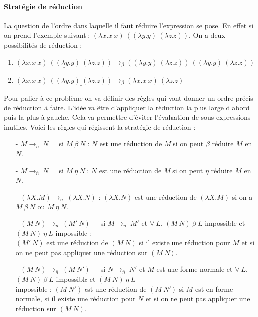 \documentclass[10pt,a4paper]{report}
\begin{document}
	
	\paragraph{Stratégie de réduction} 
	La question de l'ordre dans laquelle il faut réduire l'expression se pose. En effet si on prend l'exemple suivant : $(\lambda x.x~x)~((\lambda y.y)~(\lambda z.z))$. On a deux possibilités de réduction :
	\begin{enumerate}
		\item $\underline{(\lambda x.x~x)~((\lambda y.y)~(\lambda z.z))} \rightarrow_{\beta} ((\lambda y.y)~(\lambda z.z))~((\lambda y.y)~(\lambda z.z))$ 
		\item $(\lambda x.x~x)~\underline{((\lambda y.y)~(\lambda z.z))} \rightarrow_{\beta} (\lambda x.x~x)~(\lambda z.z)$ 
	\end{enumerate} 
	\bigbreak
	
	
	Pour palier à ce problème on va définir des règles qui vont donner un ordre précis de réduction à faire. L'idée va être d'appliquer la réduction la plus large d'abord puis la plus à gauche. Cela va permettre d'éviter l'évaluation de sous-expressions inutiles. Voici les règles qui régissent la stratégie de réduction :
	\begin{itemize}
		\item[-] $M \longrightarrow_{\bar{n}}~N$~~~si $M~\beta~N$ : $N$ est une réduction de $M$ si on peut $\beta$ réduire $M$ en $N$.
		\smallbreak
		\item[-] $M \longrightarrow_{\bar{n}}~N$~~~si $M~\eta~N$ : $N$ est une réduction de $M$ si on peut $\eta$ réduire $M$ en $N$.
		\smallbreak
		\item[-] $(\lambda X.M) \longrightarrow_{\bar{n}}~(\lambda X.N)$ : $(\lambda X.N)$ est une réduction de $(\lambda X.M)$ si on a $M~\beta~N$ ou $M~\eta~N$.
		\smallbreak
		\item[-] $(M~N) \longrightarrow_{\bar{n}}~(M'~N)$~~~si $M \longrightarrow_{\bar{n}}~M'$ et $\forall~L$, $(M~N)~\beta~L$ impossible et $(M~N)~\eta~L$ impossible :\\
		$(M'~N)$ est une réduction de $(M~N)$ si il existe une réduction pour $M$ et si on ne peut pas appliquer une réduction sur $(M~N)$.
		\smallbreak
		\item[-] $(M~N) \longrightarrow_{\bar{n}}~(M~N')$~~~si $N \longrightarrow_{\bar{n}}~N'$
		et $M$ est une forme normale
		et  $\forall~L$, $(M~N)~\beta~L$ impossible et $(M~N)~\eta~L$ \\impossible :
		$(M~N')$ est une réduction de $(M~N')$ si $M$ est en forme normale, si il existe une réduction pour $N$ et si on ne peut pas appliquer une réduction sur $(M~N)$.
	\end{itemize}
	\smallbreak
	
\end{document}
